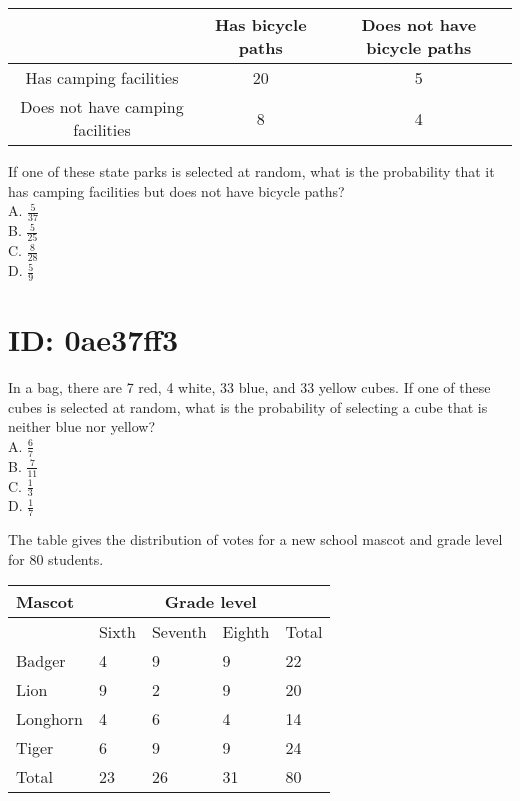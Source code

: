 \begin{center}
\begin{tabular}{|c|c|c|}
\hline
 & Has bicycle paths & Does not have bicycle paths \\
\hline
Has camping facilities & 20 & 5 \\
\hline
Does not have camping facilities & 8 & 4 \\
\hline
\end{tabular}
\end{center}

If one of these state parks is selected at random, what is the probability that it has camping facilities but does not have bicycle paths?\\
A. $\frac{5}{37}$\\
B. $\frac{5}{25}$\\
C. $\frac{8}{28}$\\
D. $\frac{5}{9}$

\section*{ID: 0ae37ff3}
In a bag, there are 7 red, 4 white, 33 blue, and 33 yellow cubes. If one of these cubes is selected at random, what is the probability of selecting a cube that is neither blue nor yellow?\\
A. $\frac{6}{7}$\\
B. $\frac{7}{11}$\\
C. $\frac{1}{3}$\\
D. $\frac{1}{7}$

The table gives the distribution of votes for a new school mascot and grade level for 80 students.

\begin{center}
\begin{tabular}{|l|l|l|l|l|}
\hline
\multirow[b]{2}{*}{Mascot} & \multicolumn{4}{|c|}{Grade level} \\
\hline
 & Sixth & Seventh & Eighth & Total \\
\hline
Badger & 4 & 9 & 9 & 22 \\
\hline
Lion & 9 & 2 & 9 & 20 \\
\hline
Longhorn & 4 & 6 & 4 & 14 \\
\hline
Tiger & 6 & 9 & 9 & 24 \\
\hline
Total & 23 & 26 & 31 & 80 \\
\hline
\end{tabular}
\end{center}


